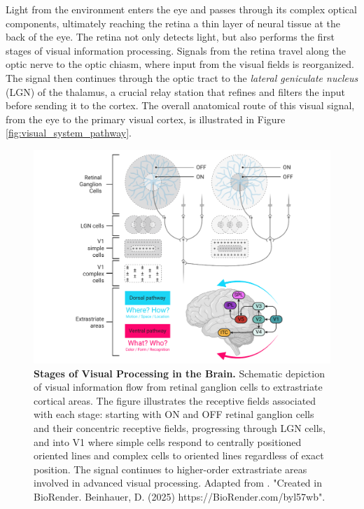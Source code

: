 Light from the environment enters the eye and passes through its complex optical components, ultimately reaching the retina a thin layer of neural tissue at the back of the eye. The retina not only detects light, but also performs the first stages of visual information processing. Signals from the retina travel along the optic nerve to the optic chiasm, where input from the visual fields is reorganized. The signal then continues through the optic tract to the \emph{lateral geniculate nucleus} (LGN) of the thalamus, a crucial relay station that refines and filters the input before sending it to the cortex. The overall anatomical route of this visual signal, from the eye to the primary visual cortex, is illustrated in Figure \ref{fig:visual_system_pathway}.

\begin{figure}
    \centering
    \includegraphics[width=\linewidth]{img/early_visual_processing.pdf}
    \caption{\textbf{Stages of Visual Processing in the Brain.} Schematic depiction of visual information flow from retinal ganglion cells to extrastriate cortical areas. The figure illustrates the receptive fields associated with each stage: starting with ON and OFF retinal ganglion cells and their concentric receptive fields, progressing through LGN cells, and into V1 where simple cells respond to centrally positioned oriented lines and complex cells to oriented lines regardless of exact position. The signal continues to higher-order extrastriate areas involved in advanced visual processing. Adapted from \citet{felleman_distributed_1991}. "Created in BioRender. Beinhauer, D. (2025) https://BioRender.com/byl57wb".}
    \label{fig:early_vis_processing}
\end{figure}

